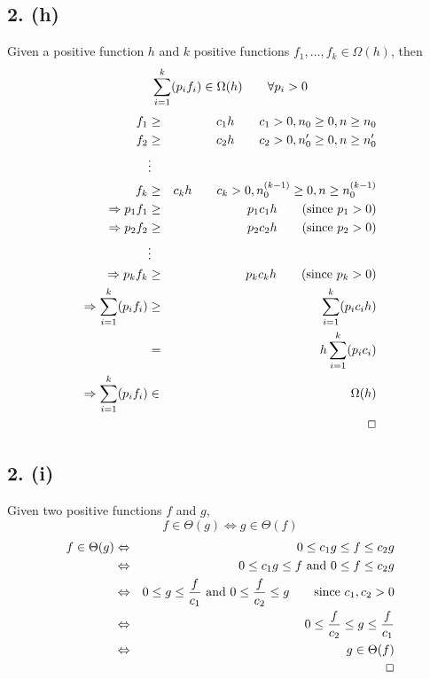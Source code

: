 \documentclass{article}[12pt]
\begin{document}
\subsection*{2. (h)}
  Given a positive function $h$ and $k$ positive functions $f_{1}, \ldots, f_{k} \in \Omega(h)$, then 
  \begin{displaymath}
    \sum_{i=1}^k(p_{i}f_{i}) \in \Omega(h) \qquad \forall p_{i} > 0 \\
  \end{displaymath}
  \begin{eqnarray*}
    f_{1}    & \geq    & c_{1}h \qquad c_{1} > 0, n_{0} \geq 0, n\geq n_{0} \\
    f_{2}    & \geq    & c_{2}h \qquad c_{2} > 0, n_{0}' \geq 0, n\geq n_{0}' \\
                       & \vdots  \\
    f_{k}    & \geq    & c_{k}h \qquad c_{k} > 0, n_{0}^{(k-1)} \geq 0, n\geq n_{0}^{(k-1)} \\
    \Rightarrow p_{1}f_{1}    & \geq    & p_{1}c_{1}h    \qquad (\textrm{since } p_{1} > 0) \\
    \Rightarrow p_{2}f_{2}    & \geq    & p_{2}c_{2}h    \qquad (\textrm{since } p_{2} > 0) \\
                              & \vdots  \\
    \Rightarrow p_{k}f_{k}    & \geq    & p_{k}c_{k}h    \qquad (\textrm{since } p_{k} > 0) \\
    \Rightarrow \sum_{i=1}^k(p_{i}f_{i}) & \geq & \sum_{i=1}^k(p_{i}c_{i}h) \\
                                         & =    & h\sum_{i=1}^k(p_{i}c_{i}) \\
    \Rightarrow \sum_{i=1}^k(p_{i}f_{i}) & \in  & \Omega(h) \\
    & & \indent \indent \indent \Box \\
  \end{eqnarray*}

\subsection*{2. (i)}
  Given two positive functions $f$ and $g$,
  \begin{displaymath}
    f \in \Theta(g) \Leftrightarrow g \in \Theta(f)
  \end{displaymath}
  \begin{eqnarray*}
    f \in \Theta(g) & \Leftrightarrow & 0 \leq c_{1}g \leq f \leq c_{2}g \\
                    & \Leftrightarrow & 0 \leq c_{1}g \leq f \textrm{ and } 0 \leq f \leq c_{2}g \\
                    & \Leftrightarrow & 0 \leq g \leq \frac{f}{c_{1}} \textrm{ and } 0 \leq \frac{f}{c_{2}} \leq g \qquad \textrm{since } c_{1},c_{2} > 0 \\
                    & \Leftrightarrow & 0 \leq \frac{f}{c_{2}} \leq g \leq \frac{f}{c_{1}} \\
                    & \Leftrightarrow & g \in \Theta(f) \\
                    &                 & \indent \indent \indent \Box \\
  \end{eqnarray*}
\end{document}
